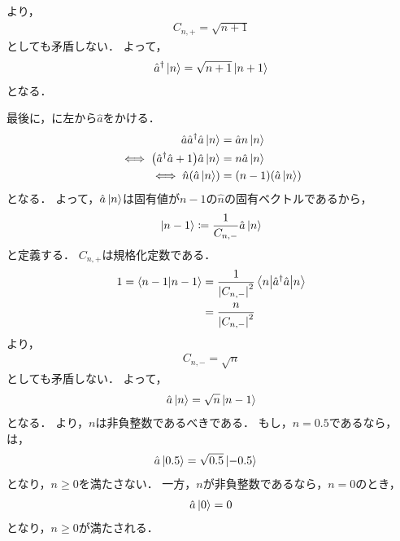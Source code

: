 \documentclass{report}
\begin{document}
    より，
    \begin{align}
      C_{n, +} = \sqrt{n + 1}
    \end{align}
    としても矛盾しない．
    よって，
    \begin{align}
      \hat{a}^{\dag}\ket{n} = \sqrt{n + 1}\ket{n + 1}\label{creation}
    \end{align}
    となる．
    \par
    最後に，に左から$\hat{a}$をかける．
    \begin{align}
      \hat{a}\hat{a}^{\dag}\hat{a}\ket{n} &= \hat{a}n\ket{n} \\ 
      \iff \qty(\hat{a}^{\dag}\hat{a} + 1)\hat{a}\ket{n} &= n\hat{a}\ket{n} \\ 
      \iff \hat{n}\qty(\hat{a}\ket{n}) &= (n - 1)\qty(\hat{a}\ket{n})
    \end{align}
    となる．
    よって，$\hat{a}\ket{n}$は固有値が$n - 1$の$\hat{n}$の固有ベクトルであるから，
    \begin{align}
      \ket{n - 1} &\coloneqq \frac{1}{C_{n, -}}\hat{a}\ket{n} \\ 
    \end{align}
    と定義する．
    $C_{n, +}$は規格化定数である．
    \begin{align}
      1 = \braket{n - 1}{n - 1} &= \frac{1}{\abs{C_{n, -}}^2}\mel**{n}{\hat{a}^{\dag}\hat{a}}{n} \\ 
      &= \frac{n}{\abs{C_{n, -}}^2}
    \end{align}
    より，
    \begin{align}
      C_{n, -} = \sqrt{n}
    \end{align}
    としても矛盾しない．
    よって，
    \begin{align}
      \hat{a}\ket{n} = \sqrt{n}\ket{n - 1}\label{annihilation}
    \end{align}
    となる．
    より，$n$は非負整数であるべきである．
    もし，$n = 0.5$であるなら，は，
    \begin{align}
      \hat{a}\ket{0.5} &= \sqrt{0.5}\ket{-0.5}
    \end{align}
    となり，$n \geq 0$を満たさない．
    一方，$n$が非負整数であるなら，$n = 0$のとき，
    \begin{align}
      \hat{a}\ket{0} = 0
    \end{align}
    となり，$n \geq 0$が満たされる．
\end{document}

